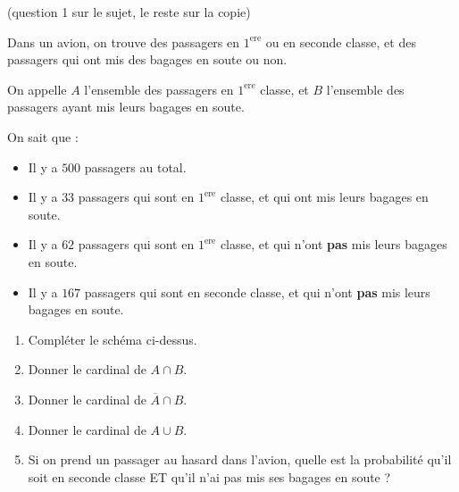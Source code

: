\documentclass[
	classe=$1^{ere}STI2D$
]{évaluation}
\begin{document}
\begin{exercice} (question 1 sur le sujet, le reste sur la copie)

	Dans un avion, on trouve des passagers en $1^\text{ere}$ ou en seconde classe, et des passagers qui ont mis des bagages en soute ou non.

	On appelle $A$ l'ensemble des passagers en $1^\text{ere}$ classe, et $B$ l'ensemble des passagers ayant mis leurs bagages en soute.

	On sait que :\vspace{1em}

	\begin{minipage}{0.5\linewidth}
		\begin{itemize}
			\item Il y a $500$ passagers au total.
			\item Il y a $33$ passagers qui sont en $1^\text{ere}$ classe, et qui ont mis leurs bagages en soute.
			\item Il y a $62$ passagers qui sont en $1^\text{ere}$ classe, et qui n'ont \textbf{pas} mis leurs bagages en soute.
			\item Il y a $167$ passagers qui sont en seconde classe, et qui n'ont \textbf{pas} mis leurs bagages en soute.
		\end{itemize}
	\end{minipage}\hspace{1cm}
	\begin{minipage}{0.4\linewidth}
	\end{minipage}

	\begin{enumerate}
		\item Compléter le schéma ci-dessus.
		\item Donner le cardinal de $A ∩ B$. 
		\item Donner le cardinal de $\overline{A} ∩ B$. 
		\item Donner le cardinal de $A ∪ B$. 
		\item Si on prend un passager au hasard dans l'avion, quelle est la probabilité qu'il soit en seconde classe ET qu'il n'ai pas mis ses bagages en soute ? 
	\end{enumerate}
\end{exercice}
\end{document}
